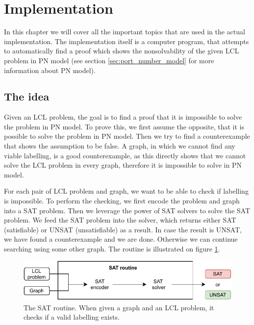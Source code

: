 

\section{Implementation} \label{sec:implementation}
In this chapter we will cover all the important topics that are used in the actual implementation.
The implementation itself is a computer program, that attempts to automatically find a proof which shows the nonsolvability of the given LCL problem in PN model (see section \ref{sec:port_number_model} for more information about PN model).


\subsection{The idea}
Given an LCL problem, the goal is to find a proof that it is impossible to solve the problem in PN model.
To prove this, we first assume the opposite, that it is possible to solve the problem in PN model.
Then we try to find a counterexample that shows the assumption to be false.
A graph, in which we cannot find any viable labelling, is a good counterexample, as this directly shows that we cannot solve the LCL problem in every graph, therefore it is impossible to solve in PN model.

For each pair of LCL problem and graph, we want to be able to check if labelling is impossible.
To perform the checking, we first encode the problem and graph into a SAT problem.
Then we leverage the power of SAT solvers to solve the SAT problem.
We feed the SAT problem into the solver, which returns either SAT (satisfiable) or UNSAT (unsatisfiable) as a result.
In case the result is UNSAT, we have found a counterexample and we are done.
Otherwise we can continue searching using some other graph.
The routine is illustrated on figure \ref{fig:implementatio:idea:1}.

\begin{figure}[h]
\centering
\includegraphics[]{diagrams/implementation_idea_diagram2.pdf}
\caption{The SAT routine. When given a graph and an LCL problem, it checks if a valid labelling exists.}
\label{fig:implementatio:idea:1}
\end{figure}

